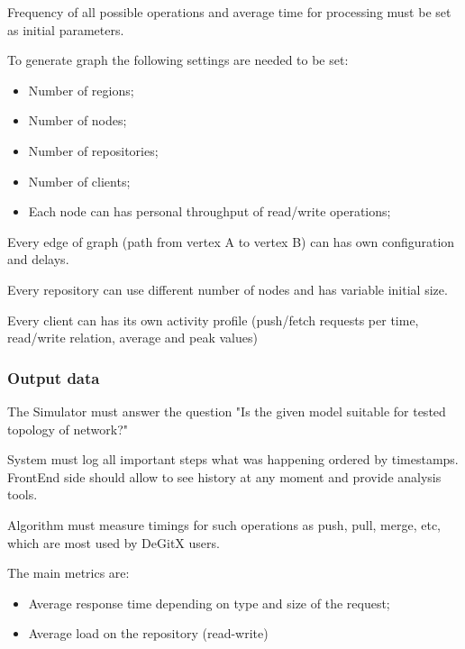 \documentclass[12pt,oneside]{article}
\begin{document}
                      Frequency of all possible operations and average time for processing must be set as initial parameters.

                      To generate graph the following settings are needed to be set:
                      \begin{itemize}
                          \item Number of regions;
                          \item Number of nodes;
                          \item Number of repositories;
                          \item Number of clients;
                          \item Each node can has personal throughput of read/write operations;
                      \end{itemize}

                      Every edge of graph (path from vertex A to vertex B) can has own configuration and delays.

                      Every repository can use different number of nodes and has variable initial size.

                      Every client can has its own activity profile (push/fetch requests per time, read/write relation, average and peak values)

                      \subsubsection{Output data}
                      \label{sec:output}

                      The Simulator must answer the question "Is the given model suitable for tested topology of network?"

                      System must log all important steps what was happening ordered by timestamps. FrontEnd side should allow to see history at any moment and provide analysis tools.

                      Algorithm must measure timings for such operations as push,  pull, merge, etc, which are most used by DeGitX users.

                      The main metrics are:
                      \begin{itemize}
                          \item Average response time depending on type and size of the request;
                          \item Average load on the repository (read-write)
                      \end{itemize}
\end{document}
